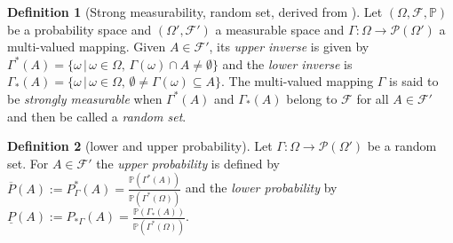\documentclass[
]{report}
\theoremstyle{definition}
\newtheorem{definition}{Definition}[section]
\begin{document}
\begin{definition}[Strong measurability, random set, derived from \cite{MIRANDA200532}]
Let $(\Omega, \mathcal{F}, \mathbb{P})$ be a probability space and $(\Omega', \mathcal{F}')$ a measurable space and $\Gamma: \Omega \rightarrow \mathcal{P}(\Omega')$ a multi-valued mapping. Given $A \in \mathcal{F}'$, its \textit{upper inverse} is given by $\Gamma^*(A) = \{\omega \, | \, \omega \in \Omega, \, \Gamma(\omega) \cap A \neq \emptyset \}$ and the \textit{lower inverse} is $\Gamma_*(A) = \{\omega \, | \, \omega \in \Omega, \, \emptyset \neq \Gamma(\omega) \subseteq A \}$. The multi-valued mapping $\Gamma$ is said to be \textit{strongly measurable} when $\Gamma^*(A)$ and $\Gamma_*(A)$ belong to $\mathcal{F}$ for all $A \in \mathcal{F}'$ and then be called a \textit{random set}.
\end{definition}

\begin{definition}[lower and upper probability]
Let $\Gamma: \Omega \rightarrow \mathcal{P}(\Omega')$ be a random set. For $A \in \mathcal{F}'$ the \textit{upper probability} is defined by $\overline{P}(A) := P^*_\Gamma (A) = \displaystyle\frac{\mathbb{P}(\Gamma^*(A))}{\mathbb{P}(\Gamma^*(\Omega))}$ and the \textit{lower probability} by $\underline{P} (A) := P_{*\Gamma} (A) = \displaystyle\frac{\mathbb{P}(\Gamma_*(A))}{\mathbb{P}(\Gamma^*(\Omega))}$.
\end{definition}
\end{document}
